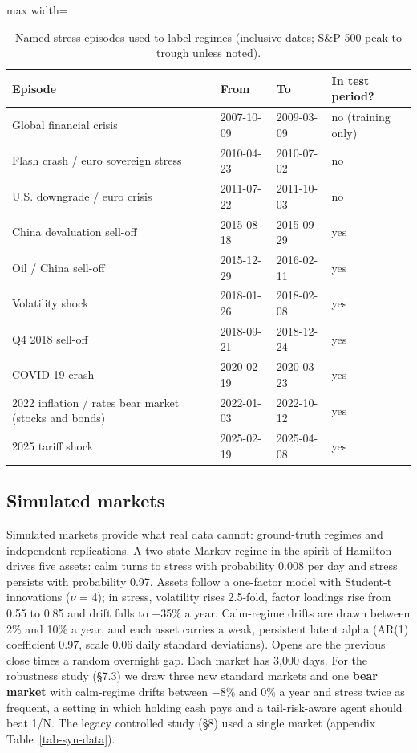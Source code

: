 \documentclass[11pt]{article}
\begin{document}
\begin{table}[!htbp]
\centering\scriptsize
\caption{Named stress episodes used to label regimes (inclusive dates; S\&P 500 peak to trough unless noted).\label{tab-episodes}}
\begin{adjustbox}{max width=\linewidth}
\begin{tabular}{@{}llll@{}}
\toprule
Episode & From & To & In test period? \\
\midrule
Global financial crisis & 2007-10-09 & 2009-03-09 & no (training only) \\
Flash crash / euro sovereign stress & 2010-04-23 & 2010-07-02 & no \\
U.S. downgrade / euro crisis & 2011-07-22 & 2011-10-03 & no \\
China devaluation sell-off & 2015-08-18 & 2015-09-29 & yes \\
Oil / China sell-off & 2015-12-29 & 2016-02-11 & yes \\
Volatility shock & 2018-01-26 & 2018-02-08 & yes \\
Q4 2018 sell-off & 2018-09-21 & 2018-12-24 & yes \\
COVID-19 crash & 2020-02-19 & 2020-03-23 & yes \\
2022 inflation / rates bear market (stocks and bonds) & 2022-01-03 & 2022-10-12 & yes \\
2025 tariff shock & 2025-02-19 & 2025-04-08 & yes \\
\bottomrule
\end{tabular}
\end{adjustbox}
\end{table}

\subsection{Simulated markets}\label{simulated-markets}

Simulated markets provide what real data cannot: ground-truth regimes and independent replications. A two-state Markov regime in the spirit of Hamilton \cite{r40} drives five assets: calm turns to stress with probability 0.008 per day and stress persists with probability 0.97. Assets follow a one-factor model with Student-t innovations ($\nu$ = 4); in stress, volatility rises 2.5-fold, factor loadings rise from 0.55 to 0.85 and drift falls to $-$35\% a year. Calm-regime drifts are drawn between 2\% and 10\% a year, and each asset carries a weak, persistent latent alpha (AR(1) coefficient 0.97, scale 0.06 daily standard deviations). Opens are the previous close times a random overnight gap. Each market has 3,000 days. For the robustness study (\S{}7.3) we draw three new standard markets and one \textbf{bear market} with calm-regime drifts between $-$8\% and 0\% a year and stress twice as frequent, a setting in which holding cash pays and a tail-risk-aware agent should beat 1/N. The legacy controlled study (\S{}8) used a single market (appendix Table~\ref{tab-syn-data}).
\end{document}
